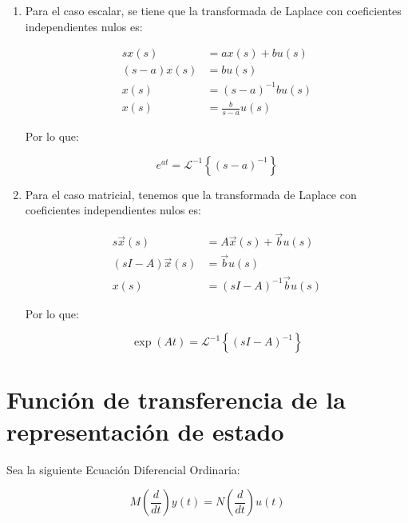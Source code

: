         \begin{enumerate}

        \item
        Para el caso escalar, se tiene que la transformada de Laplace con coeficientes independientes nulos es:

        \begin{align}
        s x(s)       & = a x(s) + b u(s) \nonumber\\
        (s - a) x(s) & = b u(s) \nonumber\\
        x(s)         & = (s - a)^{-1} b u(s) \nonumber\\
        x(s)         & = \frac{b}{s - a} u(s) \nonumber
        \end{align}

        Por lo que:

        \begin{equation}
        e^{at} = \mathcal{L}^{-1} \left\{ (s - a)^{-1} \right\}
        \end{equation}

        \item
        Para el caso matricial, tenemos que la transformada de Laplace con coeficientes independientes nulos es:

        \begin{align}
        s \vec{x}(s)         & = A \vec{x}(s) + \vec{b} u(s) \nonumber \\
        (s I - A) \vec{x}(s) & = \vec{b} u(s) \nonumber \\
        x(s)                 & = (s I - A)^{-1} \vec{b} u(s) \nonumber
        \end{align}

        Por lo que:

        \begin{equation}
        \exp{(At)} = \mathcal{L}^{-1} \left\{ (s I - A)^{-1} \right\}
        \end{equation}

        \end{enumerate}

    \section{Función de transferencia de la representación de estado}

        Sea la siguiente Ecuación Diferencial Ordinaria:

        \begin{equation}
            M \left( \frac{d}{dt} \right) y(t) = N \left( \frac{d}{dt} \right) u(t) \nonumber
        \end{equation}

